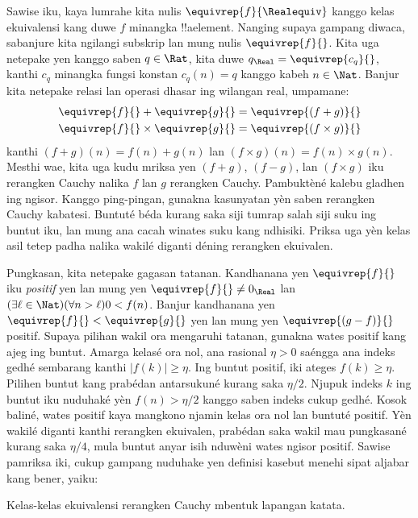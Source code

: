 \documentclass[../../../include/open-logic-section]{subfiles}
\begin{document}
Sawise iku, kaya lumrahe kita nulis $\equivrep{f}{\Realequiv}$ kanggo
kelas ekuivalensi kang duwe $f$ minangka !!a{element}. Nanging supaya
gampang diwaca, sabanjure kita ngilangi subskrip lan mung nulis
$\equivrep{f}{}$. Kita uga netepake yen kanggo saben $q \in \Rat$, kita
duwe $q_{\Real} = \equivrep{c_{q}}{}$, kanthi $c_{q}$ minangka fungsi
konstan $c_q(n) = q$ kanggo kabeh $n \in \Nat$. Banjur kita netepake
relasi lan operasi dhasar ing wilangan real, umpamane:
\begin{align*}
	\equivrep{f}{} + \equivrep{g}{} &= 	\equivrep{(f + g)}{} \\
	\equivrep{f}{} \times 	\equivrep{g}{} &= \equivrep{(f \times g)}{}
\end{align*}
kanthi $(f + g)(n) = f(n) + g(n)$ lan $(f \times g)(n) = f(n) \times
g(n)$. Mesthi wae, kita uga kudu mriksa yen $(f + g)$, $(f-g)$, lan
$(f\times g)$ iku rerangken Cauchy nalika $f$ lan $g$ rerangken Cauchy. Pambuktèné kalebu gladhen ing ngisor. Kanggo ping-pingan, gunakna
kasunyatan yèn saben rerangken Cauchy kabatesi. Buntuté béda kurang
saka siji tumrap salah siji suku ing buntut iku, lan mung ana cacah
winates suku kang ndhisiki. Priksa uga yèn kelas asil tetep padha
nalika wakilé diganti déning rerangken ekuivalen.

Pungkasan, kita netepake gagasan tatanan. Kandhanana yen
$\equivrep{f}{}$ iku \emph{positif} yen lan mung yen
$\equivrep{f}{}\neq 0_\Real$ lan $(\exists \ell \in \Nat)(\forall n >
\ell)0 < f(n)$. Banjur kandhanana yen $\equivrep{f}{} < \equivrep{g}{}$
yen lan mung yen $\equivrep{(g - f)}{}$ positif. Supaya pilihan wakil ora mengaruhi tatanan, gunakna wates
positif kang ajeg ing buntut. Amarga kelasé ora nol, ana rasional
$\eta>0$ saéngga ana indeks gedhé sembarang kanthi $|f(k)|\geq\eta$.
Ing buntut positif, iki ateges $f(k)\geq\eta$. Pilihen buntut kang
prabédan antarsukuné kurang saka $\eta/2$. Njupuk indeks $k$ ing
buntut iku nuduhaké yèn $f(n)>\eta/2$ kanggo saben indeks cukup gedhé.
Kosok baliné, wates positif kaya mangkono njamin kelas ora nol lan
buntuté positif. Yèn wakilé diganti kanthi rerangken ekuivalen,
prabédan saka wakil mau pungkasané kurang saka $\eta/4$, mula
buntut anyar isih nduwèni wates ngisor positif.
Sawise pamriksa iki, cukup gampang nuduhake yen definisi kasebut menehi
sipat aljabar kang bener, yaiku:
\begin{thm}
Kelas-kelas ekuivalensi rerangken Cauchy mbentuk lapangan katata.
\end{thm}
\end{document}
